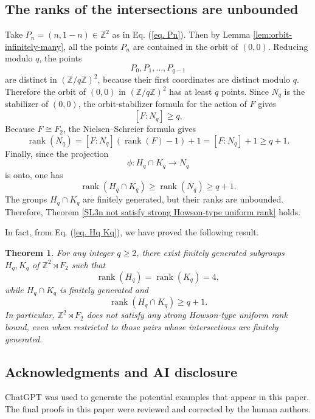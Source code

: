 \documentclass[]{amsart}
\newtheorem{thm}{Theorem}[section]
\newtheorem*{fixed point criterion}{\fixed point criterion}
\theoremstyle{definition}
\theoremstyle{remark}
\numberwithin{equation}{section}
\newcommand{\Z}{\mathbb Z}
\newcommand{\rank}{\operatorname{rank}}
\begin{document}
\subsection{The ranks of the intersections are unbounded}
Take $P_n=(n,1-n)\in \Z^2$ as in Eq. (\ref{eq. Pn}). Then by Lemma \ref{lem:orbit-infinitely-many}, all the points $P_n$ are contained in the orbit of $(0,0)$.
Reducing modulo $q$, the points
\[
P_0,P_1,\ldots,P_{q-1}
\]
are distinct in $(\Z/q\Z)^2$, because their first coordinates are distinct
modulo $q$.  Therefore the orbit of $(0,0)$ in $(\Z/q\Z)^2$ has at least $q$
points.  Since $N_q$ is the stabilizer of $(0,0)$, the orbit-stabilizer formula
for the action of $F$ gives
\[
[F:N_q]\geq q.
\]
Because $F\cong F_2$, the Nielsen--Schreier formula gives
\[
\rank(N_q)=[F:N_q](\rank(F)-1)+1=[F:N_q]+1\geq q+1.
\]
Finally, since the projection
\[
\phi: H_q\cap K_q \longrightarrow N_q
\]
is onto, one has
\[
\rank(H_q\cap K_q)\geq \rank(N_q)\geq q+1.
\]
The groups $H_q\cap K_q$ are finitely generated, but their ranks are
unbounded. Therefore, Theorem \ref{SL3n not satisfy strong Howson-type uniform rank} holds. 

In fact, from Eq. (\ref{eq. Hq Kq}), we have proved the following result.

\begin{thm}
For any integer $q\geq 2$, there exist finitely generated subgroups $H_q,K_q$ of $\Z^2\rtimes F_2$ such
that
\[
\rank(H_q)=\rank(K_q)=4,
\]
while $H_q\cap K_q$ is finitely generated and
\[
\rank(H_q\cap K_q)\geq q+1.
\]
In particular, $\Z^2\rtimes F_2$ does not satisfy any strong Howson-type uniform rank
bound, even when restricted to those pairs whose intersections are finitely
generated.
\end{thm}

\subsection*{Acknowledgments and AI disclosure}
ChatGPT was used to generate the potential examples that appear in this paper. The final proofs in this paper were reviewed and corrected by the human authors.
\end{document}
